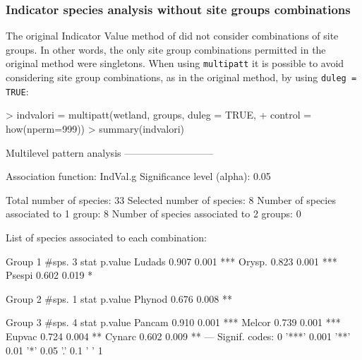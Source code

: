\documentclass[11pt,a4paper]{article}
\begin{document}
\subsubsection{Indicator species analysis without site groups combinations}
The original Indicator Value method of \citet{Dufrene1997} did not consider combinations of site groups. In other words, the only site group combinations permitted in the original method were singletons. When using \texttt{multipatt} it is possible to avoid considering site group combinations, as in the original method, by using \texttt{duleg = TRUE}:
\begin{Schunk}
\begin{Sinput}
> indvalori = multipatt(wetland, groups, duleg = TRUE, 
+                       control = how(nperm=999)) 
> summary(indvalori)
\end{Sinput}
\begin{Soutput}
 Multilevel pattern analysis
 ---------------------------

 Association function: IndVal.g
 Significance level (alpha): 0.05

 Total number of species: 33
 Selected number of species: 8 
 Number of species associated to 1 group: 8 
 Number of species associated to 2 groups: 0 

 List of species associated to each combination: 

 Group 1  #sps.  3 
        stat p.value    
Ludads 0.907   0.001 ***
Orysp. 0.823   0.001 ***
Psespi 0.602   0.019 *  

 Group 2  #sps.  1 
        stat p.value   
Phynod 0.676   0.008 **

 Group 3  #sps.  4 
        stat p.value    
Pancam 0.910   0.001 ***
Melcor 0.739   0.001 ***
Eupvac 0.724   0.004 ** 
Cynarc 0.602   0.009 ** 
---
Signif. codes:  0 '***' 0.001 '**' 0.01 '*' 0.05 '.' 0.1 ' ' 1 
\end{Soutput}
\end{Schunk}
\end{document}
